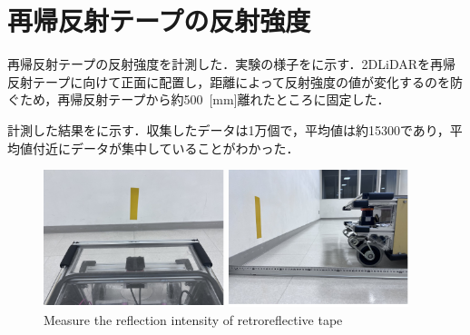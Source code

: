 \section{再帰反射テープの反射強度}

  再帰反射テープの反射強度を計測した．実験の様子をに示す．2DLiDARを再帰反射テープに向けて正面に配置し，距離によって反射強度の値が変化するのを防ぐため，再帰反射テープから約500 \,[mm]離れたところに固定した．
    
  計測した結果をに示す．収集したデータは1万個で，平均値は約15300であり，平均値付近にデータが集中していることがわかった．

  \begin{figure}[h]
    \centering
    \begin{minipage}[c]{65mm} 
        \centering
        \includegraphics[height=40mm]{images/pdf/RobotGuidance_exp2_tape_from_back}
    \end{minipage}
    \begin{minipage}[c]{65mm} 
        \centering
        \includegraphics[height=40mm]{images/pdf/RobotGuidance_exp2_tape_from_side}
    \end{minipage}
    \caption{Measure the reflection intensity of retroreflective tape}
    \label{Fig:RobotGuidance_exp2_tape}
  \end{figure}

